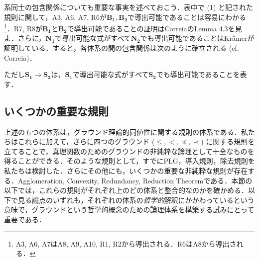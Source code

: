\documentclass[twoside,14Q,uplatex,dvipdfmx]{jsarticle}
\theoremstyle{definition}
\begin{document}
系同士の包含関係についても重要な事実を述べておこう．表中で (1) と記された規則に関して，A3, A6, A7, R6が$\mathbf{B_{1}}, \mathbf{B_{2}}$で導出可能であることは容易にわかる\footnote{A3, A6, A7はA8, A9, A10, R1, R2から導出される．R6はA8から導出される．}．R7, R8が$\mathbf{B_{1}}$と$\mathbf{B_{2}}$で導出可能であることの証明はCorreia\cite[pp. 113--4]{Correia2016}のLemma 4.3を見よ．さらに，$\mathbf{N_{1}}$で導出可能な式がすべて$\mathbf{N_{2}}$でも導出可能であることはKr\"{a}mer\cite[pp.1681--2]{Kramer2021}が証明している．すると，各体系の間の包含関係は次のように確立される (cf. Correia\cite[\emph{Erratum}]{Correia2020})．
\begin{figure}[htbp]
\centering

\end{figure}

\noindent ただし$\mathbf{S_1}\longrightarrow\mathbf{S_2}$は，$\mathbf{S_1}$で導出可能な式がすべて$\mathbf{S_2}$でも導出可能であることを表す．


\subsection{いくつかの重要な規則}\label{notes}
上述の五つの体系は，グラウンド理論的同値性に関する規則の体系である．私たちはこれらに加えて，さらに四つのグラウンド ($\leq, <, \preceq, \prec$) に関する規則を立てることで，真理関数のためのグラウンドの非純粋な論理として十全なものを得ることができる．そのような規則として，すでに\textsc{PLG}，導入規則，除去規則を私たちは検討した．さらにその他にも，いくつかの重要な非純粋な規則が存在する．Agglomeration, Convexity, Redundancy, Reduction Theoremである．本節の以下では，これらの規則がそれぞれ上のどの体系と整合的なのかを確かめる．以下で見る論点のいずれも，それぞれの体系の\emph{哲学的}解釈にかかわっているという意味で，グラウンドという哲学的概念のための論理体系を構築する試みにとって重要である．
\end{document}
